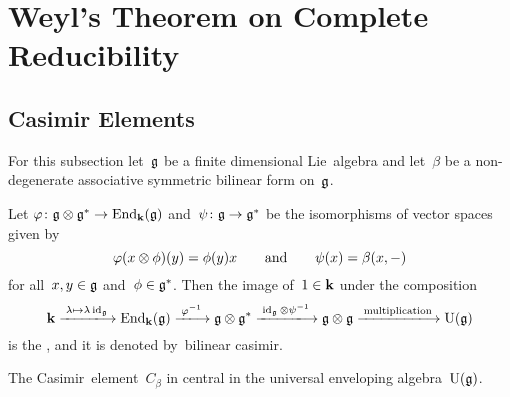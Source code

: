 \section{Weyl’s Theorem on Complete Reducibility}







\subsection{Casimir Elements}


\begin{convention}
  For this subsection let~$\mathfrak{g}$ be a finite dimensional Lie~algebra and let~$\beta$ be a non-degenerate associative symmetric bilinear form on~$\mathfrak{g}$.
\end{convention}


\begin{definition}
  \label{definition of casimir}
  Let $\varphi \colon \mathfrak{g} \otimes \mathfrak{g}^* \to \operatorname{End}_{\mathbf{k}}(\mathfrak{g})$ and~$\psi \colon \mathfrak{g} \to \mathfrak{g}^*$ be the isomorphisms of vector spaces given by
  \[
    \varphi(x \otimes \phi)(y) = \phi(y) x
    \qquad\text{and}\qquad
    \psi(x) = \beta(x, -)
  \]  
  for all~$x,y \in \mathfrak{g}$ and~$\phi \in \mathfrak{g}^*$.
  Then the image of~$1 \in \mathbf{k}$ under the composition
  \begin{equation}
    \label{casimir without coordinates}
    \kf
    \xlongto{\lambda \mapsto \lambda \id_{\glie}}
    \End_{\kf}(\glie)
    \xlongto{\varphi^{-1}}
    \glie \tensor \glie^*
    \xlongto{\id_{\glie} \tensor \psi^{-1}}
    \glie \tensor \glie
    \xlongto{\text{multiplication}}
    \Univ(\glie)
  \end{equation}
  is the , and it is denoted by~\gls*{bilinear casimir}.
\end{definition}


\begin{lemma}
  The Casimir~element~$C_\beta$ in central in the universal enveloping algebra~$\operatorname{U}(\mathfrak{g})$.
\end{lemma}


